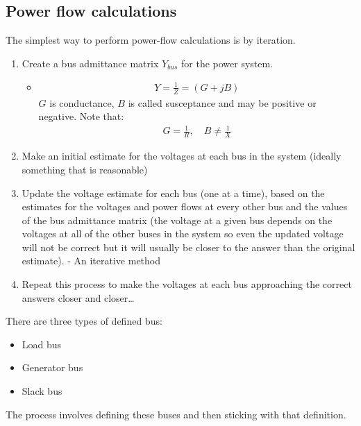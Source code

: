 \subsection{Power flow calculations}
The simplest way to perform power-flow calculations is by iteration. 
\begin{enumerate}
	\item Create a bus admittance matrix $Y_{bus}$ for the power system.
	\begin{itemize}
		\item \begin{gather}
			Y = \frac{1}{Z} = \left(G + jB\right)
		\end{gather}
		$G$ is conductance, $B$ is called susceptance and may be positive or negative. Note that: 
		\begin{gather}
			G = \frac{1}{R}, \quad B \neq \frac{1}{X}
		\end{gather}
	\end{itemize}
	\item Make an initial estimate for the voltages at each bus in the system (ideally something that is reasonable)
	\item Update the voltage estimate for each bus (one at a time), based on the estimates for the voltages and power flows at every other bus and the values of the bus admittance matrix (the voltage at a given bus depends on the voltages at all of the other buses in the system so even the updated voltage will not be correct but it will usually be closer to the answer than the original estimate). - An iterative method
	\item Repeat this process to make the voltages at each bus approaching the correct answers closer and closer\dots
\end{enumerate}
There are three types of defined bus:
\begin{itemize}
	\item Load bus
	\item Generator bus
	\item Slack bus
\end{itemize}
The process involves defining these buses and then sticking with that definition.
